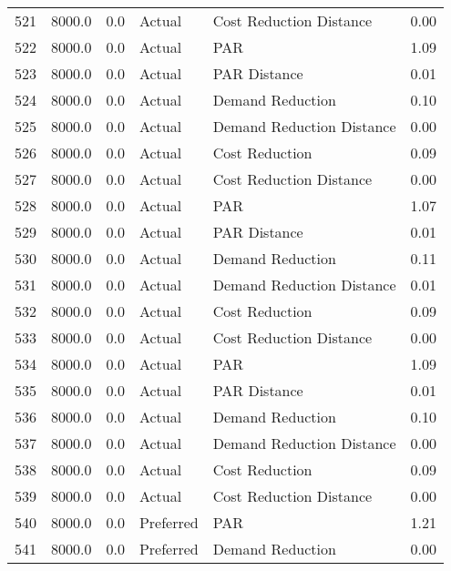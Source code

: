 \begin{longtable}{lrrllr}
521  &       8000.0 &     0.0 &         Actual &    Cost Reduction Distance &   0.00 \\
522  &       8000.0 &     0.0 &         Actual &                        PAR &   1.09 \\
523  &       8000.0 &     0.0 &         Actual &               PAR Distance &   0.01 \\
524  &       8000.0 &     0.0 &         Actual &           Demand Reduction &   0.10 \\
525  &       8000.0 &     0.0 &         Actual &  Demand Reduction Distance &   0.00 \\
526  &       8000.0 &     0.0 &         Actual &             Cost Reduction &   0.09 \\
527  &       8000.0 &     0.0 &         Actual &    Cost Reduction Distance &   0.00 \\
528  &       8000.0 &     0.0 &         Actual &                        PAR &   1.07 \\
529  &       8000.0 &     0.0 &         Actual &               PAR Distance &   0.01 \\
530  &       8000.0 &     0.0 &         Actual &           Demand Reduction &   0.11 \\
531  &       8000.0 &     0.0 &         Actual &  Demand Reduction Distance &   0.01 \\
532  &       8000.0 &     0.0 &         Actual &             Cost Reduction &   0.09 \\
533  &       8000.0 &     0.0 &         Actual &    Cost Reduction Distance &   0.00 \\
534  &       8000.0 &     0.0 &         Actual &                        PAR &   1.09 \\
535  &       8000.0 &     0.0 &         Actual &               PAR Distance &   0.01 \\
536  &       8000.0 &     0.0 &         Actual &           Demand Reduction &   0.10 \\
537  &       8000.0 &     0.0 &         Actual &  Demand Reduction Distance &   0.00 \\
538  &       8000.0 &     0.0 &         Actual &             Cost Reduction &   0.09 \\
539  &       8000.0 &     0.0 &         Actual &    Cost Reduction Distance &   0.00 \\
540  &       8000.0 &     0.0 &      Preferred &                        PAR &   1.21 \\
541  &       8000.0 &     0.0 &      Preferred &           Demand Reduction &   0.00 \\

\end{longtable}
